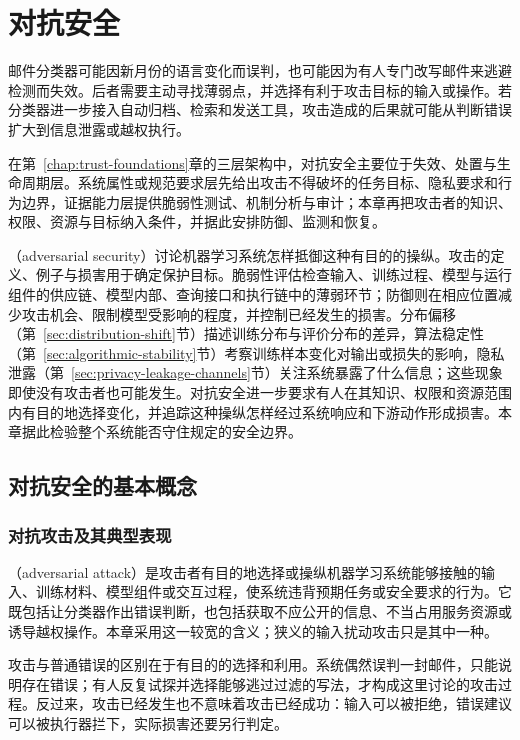 \chapter{对抗安全}
\label{chap:trust-security}

邮件分类器可能因新月份的语言变化而误判，也可能因为有人专门改写邮件来逃避检测而失效。后者需要主动寻找薄弱点，并选择有利于攻击目标的输入或操作。若分类器进一步接入自动归档、检索和发送工具，攻击造成的后果就可能从判断错误扩大到信息泄露或越权执行。

在第~\ref{chap:trust-foundations}章的三层架构中，对抗安全主要位于失效、处置与生命周期层。系统属性或规范要求层先给出攻击不得破坏的任务目标、隐私要求和行为边界，证据能力层提供脆弱性测试、机制分析与审计；本章再把攻击者的知识、权限、资源与目标纳入条件，并据此安排防御、监测和恢复。

（adversarial security）讨论机器学习系统怎样抵御这种有目的的操纵。攻击的定义、例子与损害用于确定保护目标。脆弱性评估检查输入、训练过程、模型与运行组件的供应链、模型内部、查询接口和执行链中的薄弱环节；防御则在相应位置减少攻击机会、限制模型受影响的程度，并控制已经发生的损害。分布偏移（第~\ref{sec:distribution-shift}节）描述训练分布与评价分布的差异，算法稳定性（第~\ref{sec:algorithmic-stability}节）考察训练样本变化对输出或损失的影响，隐私泄露（第~\ref{sec:privacy-leakage-channels}节）关注系统暴露了什么信息；这些现象即使没有攻击者也可能发生。对抗安全进一步要求有人在其知识、权限和资源范围内有目的地选择变化，并追踪这种操纵怎样经过系统响应和下游动作形成损害。本章据此检验整个系统能否守住规定的安全边界。

\section{对抗安全的基本概念}
\label{sec:security-threats}

\subsection{对抗攻击及其典型表现}
\label{sec:security-attack-definition}

（adversarial attack）是攻击者有目的地选择或操纵机器学习系统能够接触的输入、训练材料、模型组件或交互过程，使系统违背预期任务或安全要求的行为。它既包括让分类器作出错误判断，也包括获取不应公开的信息、不当占用服务资源或诱导越权操作。本章采用这一较宽的含义；狭义的输入扰动攻击只是其中一种。

攻击与普通错误的区别在于有目的的选择和利用。系统偶然误判一封邮件，只能说明存在错误；有人反复试探并选择能够逃过过滤的写法，才构成这里讨论的攻击过程。反过来，攻击已经发生也不意味着攻击已经成功：输入可以被拒绝，错误建议可以被执行器拦下，实际损害还要另行判定。

